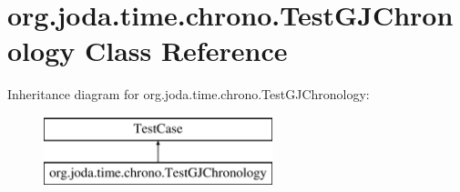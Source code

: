 \hypertarget{classorg_1_1joda_1_1time_1_1chrono_1_1_test_g_j_chronology}{\section{org.\-joda.\-time.\-chrono.\-Test\-G\-J\-Chronology Class Reference}
\label{classorg_1_1joda_1_1time_1_1chrono_1_1_test_g_j_chronology}
}
Inheritance diagram for org.\-joda.\-time.\-chrono.\-Test\-G\-J\-Chronology\-:\begin{figure}[H]
\begin{center}
\leavevmode
\includegraphics[height=2.000000cm]{classorg_1_1joda_1_1time_1_1chrono_1_1_test_g_j_chronology}
\end{center}
\end{figure}
